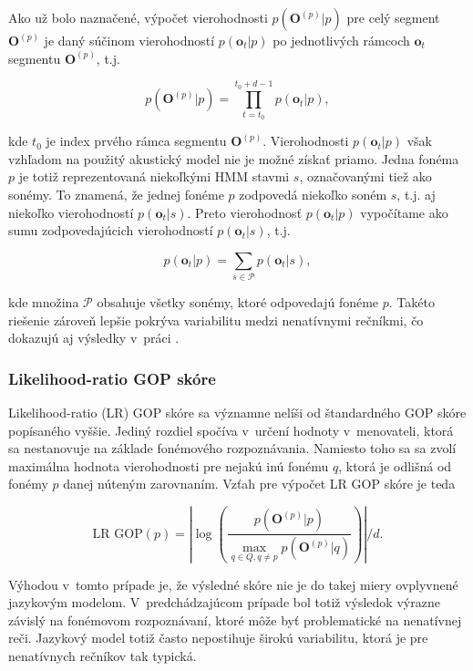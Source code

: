 Ako už bolo naznačené, výpočet vierohodnosti $p(\bm{O}^{(p)} | p)$ pre celý segment $\bm{O}^{(p)}$ je daný súčinom vierohodností $p(\bm{o}_t | p)$ po jednotlivých rámcoch $\bm{o}_t$ segmentu $\bm{O}^{(p)}$, t.j.

\begin{equation}
p(\bm{O}^{(p)} | p) = \prod_{t=t_0}^{t_0+d-1} p(\bm{o}_t | p),
\end{equation}

\noindent kde $t_0$ je index prvého rámca segmentu $\bm{O}^{(p)}$. Vierohodnosti $p(\bm{o}_t | p)$ však vzhľadom na použitý akustický model nie je možné získať priamo. Jedna fonéma $p$ je totiž reprezentovaná niekoľkými HMM stavmi $s$, označovanými tiež ako sonémy. To znamená, že jednej fonéme $p$ zodpovedá niekoľko soném $s$, t.j. aj niekoľko vierohodností $p(\bm{o}_t | s)$. Preto vierohodnosť $p(\bm{o}_t | p)$ vypočítame ako sumu zodpovedajúcich vierohodností $p(\bm{o}_t | s)$, t.j.

\begin{equation}
p(\bm{o}_t | p) = \sum_{s \in \mathscr{P}} p(\bm{o}_t | s),
\end{equation}

\noindent kde množina $\mathscr{P}$ obsahuje všetky sonémy, ktoré odpovedajú fonéme $p$. Takéto riešenie zároveň lepšie pokrýva variabilitu medzi nenatívnymi rečníkmi, čo dokazujú aj výsledky v~práci \cite{Hu2015}. %

\subsubsection{Likelihood-ratio GOP skóre}

Likelihood-ratio (LR) GOP skóre \cite{Hu2013} sa významne nelíši od štandardného GOP skóre popísaného vyššie. Jediný rozdiel spočíva v~určení hodnoty v~menovateli, ktorá sa nestanovuje na základe fonémového rozpoznávania. Namiesto toho sa sa zvolí maximálna hodnota vierohodnosti pre nejakú inú fonému $q$, ktorá je odlišná od fonémy $p$ danej núteným zarovnaním. Vzťah pre výpočet LR GOP skóre je teda 

\begin{equation} \label{eq:lr-gop}
    \text{LR GOP}(p) = \left| \log \left( \frac{p(\bm{O}^{(p)} | p)}{\max_{q \in Q, q \neq p} p(\bm{O}^{(p)} | q)} \right) \right| \bigg/ d.
\end{equation}

\noindent Výhodou v~tomto prípade je, že výsledné skóre nie je do takej miery ovplyvnené jazykovým modelom. V~predchádzajúcom prípade bol totiž výsledok výrazne závislý na fonémovom rozpoznávaní, ktoré môže byť problematické na nenatívnej reči. Jazykový model totiž často nepostihuje širokú variabilitu, ktorá je pre nenatívnych rečníkov tak typická.

